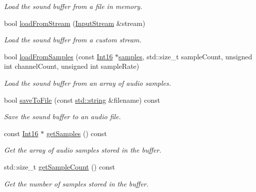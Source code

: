 \begin{DoxyCompactItemize}
\begin{DoxyCompactList}\small\item\em Load the sound buffer from a file in memory. \end{DoxyCompactList}\item 
bool \hyperlink{classsf_1_1_sound_buffer_ad292156b1e01f6dabd4c0c277d5e079e}{load\-From\-Stream} (\hyperlink{classsf_1_1_input_stream}{Input\-Stream} \&stream)
\begin{DoxyCompactList}\small\item\em Load the sound buffer from a custom stream. \end{DoxyCompactList}\item 
bool \hyperlink{classsf_1_1_sound_buffer_a63da986e144b578135edd48e51c565e8}{load\-From\-Samples} (const \hyperlink{namespacesf_a3c8e10435e2a310a7741755e66b5c94e}{Int16} $\ast$\hyperlink{gl3_8h_aba70cd077c2c52c15358c231c6d293aa}{samples}, std\-::size\-\_\-t sample\-Count, unsigned int channel\-Count, unsigned int sample\-Rate)
\begin{DoxyCompactList}\small\item\em Load the sound buffer from an array of audio samples. \end{DoxyCompactList}\item 
bool \hyperlink{classsf_1_1_sound_buffer_ab2083dc1a934c64959d9e3f162328a76}{save\-To\-File} (const \hyperlink{gl3_8h_ac83513893df92266f79a515488701770}{std\-::string} \&filename) const 
\begin{DoxyCompactList}\small\item\em Save the sound buffer to an audio file. \end{DoxyCompactList}\item 
const \hyperlink{namespacesf_a3c8e10435e2a310a7741755e66b5c94e}{Int16} $\ast$ \hyperlink{classsf_1_1_sound_buffer_a4ba0c1e5b5be500af42de30b1360eb2e}{get\-Samples} () const 
\begin{DoxyCompactList}\small\item\em Get the array of audio samples stored in the buffer. \end{DoxyCompactList}\item 
std\-::size\-\_\-t \hyperlink{classsf_1_1_sound_buffer_a2df1f1ae89213adee1494b95bb583f9d}{get\-Sample\-Count} () const 
\begin{DoxyCompactList}\small\item\em Get the number of samples stored in the buffer. \end{DoxyCompactList}\item 

\end{DoxyCompactItemize}

